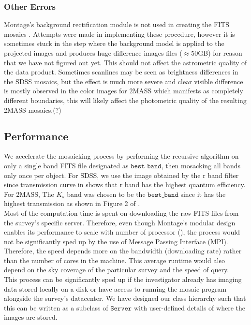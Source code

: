 \documentclass[5p]{elsarticle}
\begin{document}
	 	\subsubsection{Other Errors}
	 		Montage's background rectification module is not used in creating the FITS mosaics . Attempts were made in implementing these procedure, however it  is sometimes stuck in the step where the background model is applied to the projected images and  produces huge difference images files ($\approx$50GB) for reason that we have not figured out yet. This should not affect the astrometric quality of the data product. Sometimes scanlines may be seen as brightness differences in the SDSS mosaics, but the effect is much more severe and clear visible difference is  mostly  observed in the color images for 2MASS which manifests as completely different boundaries, this  will likely affect the photometric quality of the resulting 2MASS mosaics.(?)
	\subsection{Performance}	
	\indent We accelerate the mosaicking process by performing the recursive algorithm on only a single band FITS file designated as $\texttt{best\_band}$, then mosacking all bands only once per object. For SDSS, we use the image obtained by the r band filter since transmission curve in \citet{edr} shows that r band has the highest quantum efficiency.	 For 2MASS, The $K_s$ band was chosen to be the $\texttt{best\_band}$ since it has the highest transmission as shown  in Figure 2 of \citet{2mass}.
	\\
	 \indent  Most of the computation time is spent on downloading the raw FITS files from the survey's specific server. Therefore, even though Montage's modular design enables its performance to scale with number of processor  (\citet{montage}), the process would not be significantly sped up by the use of Message Passing Interface (MPI). Therefore, the speed depends more on the bandwidth (downloading rate) rather than the number of cores in the machine. This average runtime would also depend on the sky coverage of the  particular survey and the speed of query.
	\\ \indent This process can  be significantly sped up if the investigator already has imaging data stored locally on a disk or have access to running the mosaic program alongside the survey's datacenter. We have designed our class hierarchy such that this can be written as a subclass of $\texttt{Server}$ with user-defined details of where the images are stored.
\end{document}
